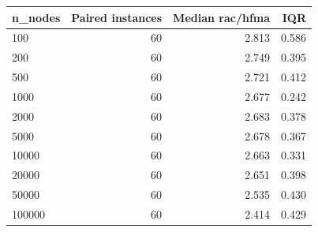 \begin{tabular}{lrrr}
\toprule
n\_nodes & Paired instances & Median rac/hfma & IQR \\
\midrule
100 & 60 & 2.813 & 0.586 \\
200 & 60 & 2.749 & 0.395 \\
500 & 60 & 2.721 & 0.412 \\
1000 & 60 & 2.677 & 0.242 \\
2000 & 60 & 2.683 & 0.378 \\
5000 & 60 & 2.678 & 0.367 \\
10000 & 60 & 2.663 & 0.331 \\
20000 & 60 & 2.651 & 0.398 \\
50000 & 60 & 2.535 & 0.430 \\
100000 & 60 & 2.414 & 0.429 \\
\bottomrule
\end{tabular}

